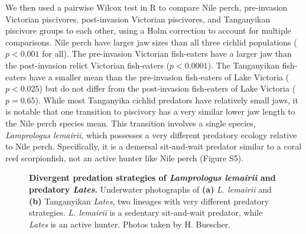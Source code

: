 We then used a pairwise Wilcox test in R to compare Nile perch, pre-invasion Victorian piscivores, post-invasion Victorian piscivores, and Tanganyikan piscivore groups to each other, using a Holm correction to account for multiple comparisons. Nile perch have larger jaw sizes than all three cichlid populations ($p<0.001$ for all). The pre-invasion Victorian fish-eaters have a larger jaw than the post-invasion relict Victorian fish-eaters ($p<0.0001$). The Tanganyikan fish-eaters have a smaller mean than the pre-invasion fish-eaters of Lake Victoria ($p<0.025$) but do not differ from the post-invasion fish-eaters of Lake Victoria ($p=0.65$). While most Tanganyika cichlid predators have relatively small jaws, it is notable that one transition to piscivory has a very similar lower jaw length to the Nile perch species mean. This transition involves a single species, {\em Lamprologus lemairii}, which possesses a very different predatory ecology relative to Nile perch. Specifically, it is a demersal sit-and-wait predator similar to a coral reef scorpionfish, not an active hunter like Nile perch (Figure S5). 

\begin{figure}
    \centering
    \caption{\textbf{Divergent predation strategies of {\em Lamprologus lemairii} and predatory {\em Lates}.} Underwater photographs of \textbf{(a)} {\em L. lemairii} and \textbf{(b)} Tanganyikan {\em Lates}, two lineages with very different predatory strategies. {\em L. lemairii} is a sedentary sit-and-wait predator, while {\em Lates} is an active hunter. Photos taken by H. Buescher.}
    \label{FJ_fig8}
\end{figure}







